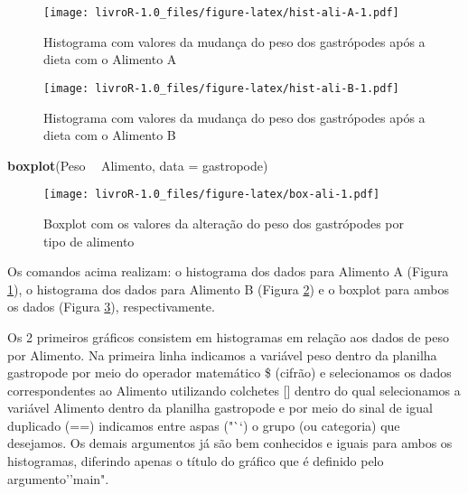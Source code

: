 \documentclass[]{book}
\newenvironment{Shaded}{\begin{snugshade}}{\end{snugshade}}
\newcommand{\DataTypeTok}[1]{\textcolor[rgb]{0.13,0.29,0.53}{#1}}
\newcommand{\KeywordTok}[1]{\textcolor[rgb]{0.13,0.29,0.53}{\textbf{#1}}}
\newcommand{\NormalTok}[1]{#1}
\newcommand{\OperatorTok}[1]{\textcolor[rgb]{0.81,0.36,0.00}{\textbf{#1}}}
\newcommand{\StringTok}[1]{\textcolor[rgb]{0.31,0.60,0.02}{#1}}
\begin{document}
\begin{figure}
\centering
\texttt{[image: livroR-1.0\_files/figure-latex/hist-ali-A-1.pdf]}
\caption{\label{fig:hist-ali-A}Histograma com valores da mudança do peso dos gastrópodes após a dieta com o Alimento A}
\end{figure}

\begin{Shaded}
\end{Shaded}

\begin{figure}
\centering
\texttt{[image: livroR-1.0\_files/figure-latex/hist-ali-B-1.pdf]}
\caption{\label{fig:hist-ali-B}Histograma com valores da mudança do peso dos gastrópodes após a dieta com o Alimento B}
\end{figure}

\begin{Shaded}
\begin{Highlighting}[]
\KeywordTok{boxplot}\NormalTok{(Peso }\OperatorTok{~}\StringTok{ }\NormalTok{Alimento, }\DataTypeTok{data =}\NormalTok{ gastropode)}
\end{Highlighting}
\end{Shaded}

\begin{figure}
\centering
\texttt{[image: livroR-1.0\_files/figure-latex/box-ali-1.pdf]}
\caption{\label{fig:box-ali}Boxplot com os valores da alteração do peso dos gastrópodes por tipo de alimento}
\end{figure}

Os comandos acima realizam: o histograma dos dados para Alimento A (Figura \ref{fig:hist-ali-A}), o histograma dos dados para Alimento B (Figura \ref{fig:hist-ali-B}) e o boxplot para ambos os dados (Figura \ref{fig:box-ali}), respectivamente.

Os 2 primeiros gráficos consistem em histogramas em relação aos dados de peso por Alimento. Na primeira linha indicamos a variável peso dentro da planilha gastropode por meio do operador matemático \$ (cifrão) e selecionamos os dados correspondentes ao Alimento utilizando colchetes {[}{]} dentro do qual selecionamos a variável Alimento dentro da planilha gastropode e por meio do sinal de igual duplicado (==) indicamos entre aspas ("``) o grupo (ou categoria) que desejamos. Os demais argumentos já são bem conhecidos e iguais para ambos os histogramas, diferindo apenas o título do gráfico que é definido pelo argumento''main".
\end{document}
